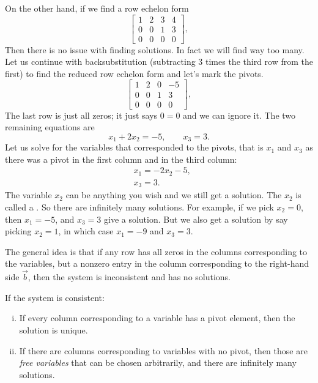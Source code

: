 On the other hand, if we find a row echelon form
\begin{equation*}
\left[
\begin{array}{ccc|c}
1 & 2 & 3 & 4 \\
0 & 0 & 1 & 3 \\
0 & 0 & 0 & 0 
\end{array}
\right] ,
\end{equation*}
Then there is no issue with finding solutions.  In fact we will find way too
many.  Let us continue with backsubstitution (subtracting 3 times the third
row from the first) to find the reduced row echelon form and let's mark the
pivots.
\begin{equation*}
\left[
\begin{array}{ccc|c}
\boxed{1} & 2 & 0 & -5 \\
0 & 0 & \boxed{1} & 3 \\
0 & 0 & 0 & 0 
\end{array}
\right] ,
\end{equation*}
The last row is just all zeros; it just says $0=0$ and we can ignore it.
The two remaining equations are 
\begin{equation*}
x_1 + 2 x_2 = -5 , \qquad
x_3 = 3 .
\end{equation*}
Let us solve for the variables that corresponded to the
pivots, that is $x_1$ and $x_3$ as there was a pivot in the first column
and in the third column:
\begin{align*}
& x_1 = - 2 x_2 -5 , \\
& x_3 = 3 .
\end{align*}
The variable $x_2$ can be anything you wish and we still get a solution.
The $x_2$ is called a \emph{}.
So there are infinitely many solutions.  For example, if we pick $x_2=0$,
then $x_1 = -5$, and $x_3 = 3$ give a solution.  But we also get a solution
by say picking $x_2 = 1$, in which case $x_1 = -9$ and $x_3 = 3$.

\medskip

The general idea is that
if any row has all zeros in the columns corresponding to the
variables, but a nonzero entry in the column corresponding to the
right-hand side $\vec{b}$, then the system is inconsistent and has no solutions.

If the system is consistent:
\begin{enumerate}[(i)]
\item If every column corresponding to a variable has a pivot element,
then the solution is unique.
\item If there are columns corresponding to variables with no pivot,
then those are \emph{free variables} that can be chosen
arbitrarily, and there are infinitely many solutions.
\end{enumerate}

